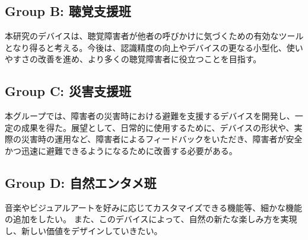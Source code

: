 \subsection{Group B: 聴覚支援班}
本研究のデバイスは、聴覚障害者が他者の呼びかけに気づくための有効なツールとなり得ると考える。今後は、認識精度の向上やデバイスの更なる小型化、使いやすさの改善を進め、より多くの聴覚障害者に役立つことを目指す。
\subsection{Group C: 災害支援班}
本グループでは、障害者の災害時における避難を支援するデバイスを開発し、一定の成果を得た。展望として、日常的に使用するために、デバイスの形状や、実際の災害時の運用など、障害者によるフィードバックをいただき、障害者が安全かつ迅速に避難できるようになるために改善する必要がある。
\subsection{Group D: 自然エンタメ班}
音楽やビジュアルアートを好みに応じてカスタマイズできる機能等、細かな機能の追加をしたい。
また、このデバイスによって、自然の新たな楽しみ方を実現し、新しい価値をデザインしていきたい。

